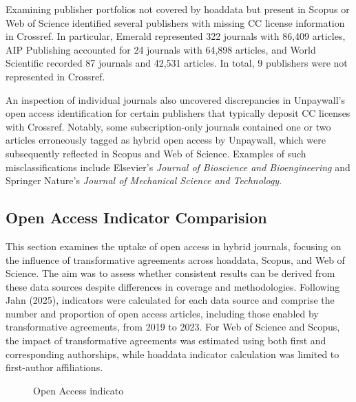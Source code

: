 \documentclass[a4paper,man,floatsintext,longtable,noextraspace,10pt]{apa6}
\begin{document}
Examining publisher portfolios not covered by hoaddata but present in
Scopus or Web of Science identified several publishers with missing CC
license information in Crossref. In particular, Emerald represented 322
journals with 86,409 articles, AIP Publishing accounted for 24 journals
with 64,898 articles, and World Scientific recorded 87 journals and
42,531 articles. In total, 9 publishers were not represented in
Crossref.

An inspection of individual journals also uncovered discrepancies in
Unpaywall's open access identification for certain publishers that
typically deposit CC licenses with Crossref. Notably, some
subscription-only journals contained one or two articles erroneously
tagged as hybrid open access by Unpaywall, which were subsequently
reflected in Scopus and Web of Science. Examples of such
misclassifications include Elsevier's \emph{Journal of Bioscience and
Bioengineering} and Springer Nature's \emph{Journal of Mechanical
Science and Technology}.

\subsection{Open Access Indicator
Comparision}\label{open-access-indicator-comparision}

This section examines the uptake of open access in hybrid journals,
focusing on the influence of transformative agreements across hoaddata,
Scopus, and Web of Science. The aim was to assess whether consistent
results can be derived from these data sources despite differences in
coverage and methodologies. Following Jahn (2025), indicators were
calculated for each data source and comprise the number and proportion
of open access articles, including those enabled by transformative
agreements, from 2019 to 2023. For Web of Science and Scopus, the impact
of transformative agreements was estimated using both first and
corresponding authorships, while hoaddata indicator calculation was
limited to first-author affiliations.

\begin{figure}[ht!]


\caption{\label{fig-uptake_overview}Open Access indicato}

\end{figure}%
\end{document}
